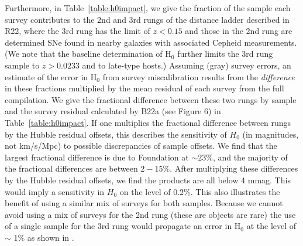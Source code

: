 \documentclass[twocolumn]{aastex63}
\begin{document}
Furthermore, in Table~\ref{table:h0impact}, we give the fraction of the sample each survey contributes to the 2nd and 3rd rungs of the distance ladder described in R22, where the 3rd rung has the limit of $z<0.15$ and those in the 2nd rung are determined SNe found in nearby galaxies with associated Cepheid measurements.  (We note that the baseline determination of H$_0$ further limits the 3rd rung sample to $z>0.0233$ and to late-type hosts.)  Assuming (gray) survey errors, an estimate of the error in H$_0$ from survey miscalibration results from the {\it difference} in these fractions multiplied  by the mean residual of each survey from the full compilation.    We give the fractional difference between these two rungs by sample and the survey residual calculated by B22a (see Figure 6) in Table~\ref{table:h0impact}. If one multiplies the fractional difference between rungs by the Hubble residual offsets, this describes the sensitivity of $H_0$ (in magnitudes, not km/s/Mpc) to possible discrepancies of sample offsets. We find that the largest fractional difference is due to Foundation at $\sim23\%$, and the majority of the fractional differences are between $2-15\%$.  After multiplying these differences by the Hubble residual offsets, we find the products are all below 4 mmag.  This would imply a sensitivity in $H_0$ on the level of $0.2\%$.  This also illustrates the benefit of using a similar mix of surveys for both samples.  Because we cannot avoid using a mix of surveys for the 2nd rung (these are objects are rare) the use of a single sample for the 3rd rung would propagate an error in H$_0$ at the level of $\sim$ 1\% as shown in \citet{Brownsberger21}.
\end{document}
